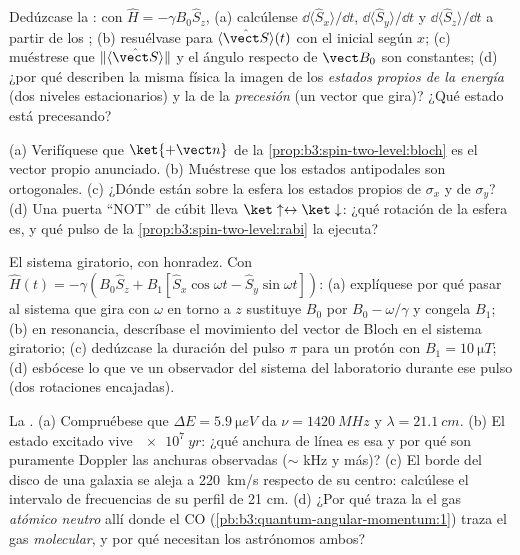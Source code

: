 \begin{exercise}[$\star\star$]\label{exo:b3:spin-two-level:5}
Dedúzcase la : con $\hat H = -\gamma B_0\hat S_z$, (a)
calcúlense $\dd\langle\hat S_x\rangle/\dd t$, $\dd\langle\hat
S_y\rangle/\dd t$ y $\dd\langle\hat S_z\rangle/\dd t$ a partir de los
; (b) resuélvase para $\langle\hat{\vect S}\rangle(t)$ con
el  inicial según $x$; (c) muéstrese que $\|\langle\hat{\vect S}\rangle\|$
y el ángulo respecto de $\vect B_0$ son constantes; (d) ¿por qué describen
la misma física la imagen de los \emph{estados propios de la energía} (dos
niveles estacionarios) y la de la \emph{precesión} (un vector que gira)?
¿Qué estado está precesando?
\end{exercise}

\begin{exercise}[$\star\star$]\label{exo:b3:spin-two-level:6}
(a) Verifíquese que $\ket{+\vect n}$ de la
\cref{prop:b3:spin-two-level:bloch} es el vector propio anunciado. (b)
Muéstrese que los estados antipodales son ortogonales. (c) ¿Dónde están
sobre la esfera los estados propios de $\sigma_x$ y de $\sigma_y$? (d) Una
puerta ``NOT'' de cúbit lleva $\ket\uparrow \leftrightarrow \ket\downarrow$:
¿qué rotación de la esfera es, y qué pulso de la
\cref{prop:b3:spin-two-level:rabi} la ejecuta?
\end{exercise}

\begin{exercise}[$\star\star$]\label{exo:b3:spin-two-level:7}
El sistema giratorio, con honradez. Con $\hat H(t) = -\gamma(B_0\hat S_z
+ B_1[\hat S_x\cos\omega t - \hat S_y\sin\omega t])$: (a) explíquese
por qué pasar al sistema que gira con $\omega$ en torno a $z$ sustituye
$B_0$ por $B_0 - \omega/\gamma$ y congela $B_1$; (b) en resonancia,
descríbase el movimiento del vector de Bloch en el sistema giratorio; (c)
dedúzcase la duración del pulso $\pi$ para un protón con $B_1 =
\qty{10}{\micro T}$; (d) esbócese lo que ve un observador del sistema del
laboratorio durante ese pulso (dos rotaciones encajadas).
\end{exercise}

\begin{exercise}[$\star\star$]\label{exo:b3:spin-two-level:8}
La . (a) Compruébese que $\Delta E = \qty{5.9}{\micro eV}$
da $\nu = \qty{1420}{MHz}$ y $\lambda = \qty{21.1}{cm}$. (b)
El estado excitado vive $\qty{e7}{yr}$: ¿qué anchura de línea es esa y
por qué son puramente Doppler las anchuras observadas ($\sim$ kHz y más)?
(c) El borde del disco de una galaxia se aleja a \qty{220}{km/s} respecto
de su centro: calcúlese el intervalo de frecuencias de su perfil de 21 cm.
(d) ¿Por qué traza la  el gas \emph{atómico neutro} allí donde
el CO (\cref{pb:b3:quantum-angular-momentum:1}) traza el gas
\emph{molecular}, y por qué necesitan los astrónomos ambos?
\end{exercise}

